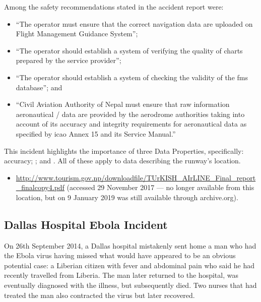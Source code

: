 Among the safety recommendations stated in the accident report were:
\begin{itemize}
  \item ``The operator must ensure that the correct navigation data are uploaded on Flight Management Guidance System''; 
  \item ``The operator should establish a system of verifying the quality of charts prepared by the service provider''; 
  \item ``The operator should establish a system of checking the validity of the \gls{fms} \gls{database}''; and
  \item ``Civil Aviation Authority of Nepal must ensure that raw \gls{information aeronautical} / data are provided by the aerodrome authorities taking into account of its accuracy and \gls{integrity} requirements for \gls{aeronautical data} as specified by \gls{icao} Annex 15 and its  Service Manual.''
\end{itemize}

This incident highlights the importance of three Data Properties, specifically: \gls{accuracy}; ; and . All of these apply to data describing the runway's location.

\begin{samepage}
\begin{itemize}
  \item \raggedright{\href{https://web.archive.org/web/20170709044727/http://www.tourism.gov.np/downloadfile/TUrKISH_AIrLINE_Final_report_finalcopy4.pdf}{http://www.tourism.gov.np/downloadfile/TUrKISH\_AIrLINE\_Final\_report\_finalcopy4.pdf} (accessed 29 November 2017 --- no longer available from this location, but on 9 January 2019 was still available through archive.org).}
\end{itemize}
\end{samepage}


\subsection{Dallas Hospital Ebola Incident} \label{bkm:incacc:dallasebola}
On 26th September 2014, a Dallas hospital mistakenly sent home a man who had the Ebola virus having missed what would have appeared to be an obvious potential case: a Liberian citizen with fever and abdominal pain who said he had recently travelled from Liberia. The man later returned to the hospital, was eventually diagnosed with the illness, but subsequently died. Two nurses that had treated the man also contracted the virus but later recovered.

